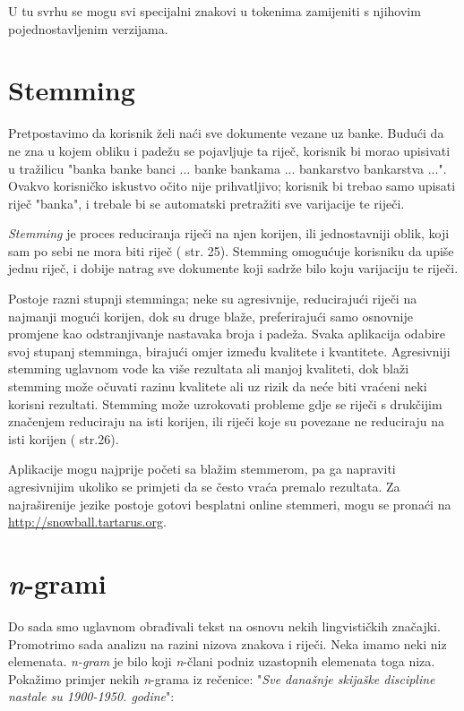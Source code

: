 \documentclass[11pt]{scrreprt}
\begin{document}
U tu svrhu se mogu svi specijalni znakovi u tokenima zamijeniti s njihovim pojednostavljenim verzijama.

\section{Stemming}

Pretpostavimo da korisnik želi naći sve dokumente vezane uz banke. Budući da ne zna u kojem obliku i padežu se pojavljuje ta riječ, korisnik bi morao upisivati u tražilicu "banka banke banci ... banke bankama ... bankarstvo bankarstva ...". Ovakvo korisničko iskustvo očito nije prihvatljivo; korisnik bi trebao samo upisati riječ "banka", i trebale bi se automatski pretražiti sve varijacije te riječi.

\textit{Stemming} je proces reduciranja riječi na njen korijen, ili jednostavniji oblik, koji sam po sebi ne mora biti riječ (\cite{taming} str. 25). Stemming omogućuje korisniku da upiše jednu riječ, i dobije natrag sve dokumente koji sadrže bilo koju varijaciju te riječi.

Postoje razni stupnji stemminga; neke su agresivnije, reducirajući riječi na najmanji mogući korijen, dok su druge blaže, preferirajući samo osnovnije promjene kao odstranjivanje nastavaka broja i padeža. Svaka aplikacija odabire svoj stupanj stemminga, birajući omjer između kvalitete i kvantitete. Agresivniji stemming uglavnom vode ka više rezultata ali manjoj kvaliteti, dok blaži stemming može očuvati razinu kvalitete ali uz rizik da neće biti vraćeni neki korisni rezultati. Stemming može uzrokovati probleme gdje se riječi s drukčijim značenjem reduciraju na isti korijen, ili riječi koje su povezane ne reduciraju na isti korijen (\cite{taming} str.26).

Aplikacije mogu najprije početi sa blažim stemmerom, pa ga napraviti agresivnijim ukoliko se primjeti da se često vraća premalo rezultata. Za najraširenije jezike postoje gotovi besplatni online stemmeri, mogu se pronaći na \url{http://snowball.tartarus.org}.

\section{\textit{n}-grami}

Do sada smo uglavnom obrađivali tekst na osnovu nekih lingvističkih značajki. Promotrimo sada analizu na razini nizova znakova i riječi. Neka imamo neki niz elemenata. \textit{n-gram} je bilo koji \textit{n}-člani podniz uzastopnih elemenata toga niza. Pokažimo primjer nekih \textit{n}-grama iz rečenice: "\textit{Sve današnje skijaške discipline nastale su 1900-1950. godine}":
\end{document}
